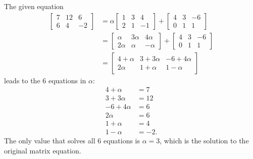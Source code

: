 The given equation 
\begin{align*}
\begin{bmatrix} 7 & 12 & 6\\ 6 & 4 & -2 \end{bmatrix} 
&= 
\alpha\begin{bmatrix} 
1 & 3 & 4 \\
 2 & 1 & -1 
\end{bmatrix} 
+ 
\begin{bmatrix} 
4 & 3 & -6 \\
0 & 1 & 1 
\end{bmatrix}\\
%
&= 
\begin{bmatrix} 
\alpha & 3\alpha & 4\alpha \\ 
2\alpha & \alpha & -\alpha 
\end{bmatrix} 
+ 
\begin{bmatrix} 
4 & 3 & -6 \\ 
0 & 1 & 1 
\end{bmatrix}\\
%
&=
\begin{bmatrix} 
4 + \alpha & 3 + 3\alpha & -6 + 4\alpha \\ 
2\alpha & 1 + \alpha & 1 - \alpha 
\end{bmatrix}
\end{align*}
%
leads to the 6 equations in $\alpha$:
%
\begin{align*}
4 + \alpha &= 7\\
3 + 3\alpha &= 12\\
-6 + 4\alpha &= 6\\
2\alpha &= 6\\
1 + \alpha &= 4\\
1 - \alpha &= -2.
\end{align*}
The only value that solves all 6 equations is $\alpha = 3$, which is the solution to the original matrix equation.
